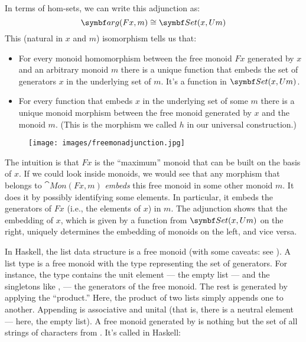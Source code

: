 In terms of hom-sets, we can write this adjunction as:
\[\cat{arg}(F x, m) \cong \Set(x, U m)\]
This (natural in $x$ and $m$) isomorphism tells us that:

\begin{itemize}
\tightlist
\item
  For every monoid homomorphism between the free monoid $F x$
  generated by $x$ and an arbitrary monoid $m$ there is a
  unique function that embeds the set of generators $x$ in the
  underlying set of $m$. It's a function in
  $\Set(x, U m)$.
\item
  For every function that embeds $x$ in the underlying set of
  some $m$ there is a unique monoid morphism between the free
  monoid generated by $x$ and the monoid $m$. (This is the
  morphism we called $h$ in our universal construction.)
\end{itemize}

\begin{figure}[H]
\centering
\texttt{[image: images/freemonadjunction.jpg]}
\end{figure}

\noindent
The intuition is that $F x$ is the ``maximum'' monoid that can
be built on the basis of $x$. If we could look inside monoids, we
would see that any morphism that belongs to $\cat{Mon}(F x, m)$
\emph{embeds} this free monoid in some other monoid $m$. It does
it by possibly identifying some elements. In particular, it embeds the
generators of $F x$ (i.e., the elements of $x$) in
$m$. The adjunction shows that the embedding of $x$, which
is given by a function from $\Set(x, U m)$ on the right,
uniquely determines the embedding of monoids on the left, and vice
versa.

In Haskell, the list data structure is a free monoid (with some caveats:
see ). A list type \code{{[}a{]}} is a free monoid with
the type  representing the set of generators. For instance,
the type \code{{[}Char{]}} contains the unit element --- the empty
list \code{{[}{]}} --- and the singletons like
\code{{[}'a'{]}}, \code{{[}'b'{]}} --- the
generators of the free monoid. The rest is generated by applying the
``product.'' Here, the product of two lists simply appends one to
another. Appending is associative and unital (that is, there is a
neutral element --- here, the empty list). A free monoid generated by
 is nothing but the set of all strings of characters from
. It's called  in Haskell:


